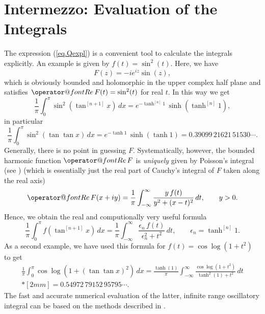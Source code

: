 \documentclass[10pt]{amsart}
\makeatletter
\renewcommand{\Re}{{\operator@font Re\,}}
\makeatother
\begin{document}
\section{Intermezzo: Evaluation of the Integrals}
\noindent
The expression (\ref{eq.Qexpl}) is a convenient tool to calculate the integrals explicitly. An example is given by $f(t) = \sin^2(t)$. Here,
we have
\[
F(z) = -i e^{iz} \sin(z),
\]
which is obviously bounded and holomorphic in the upper complex half plane and satisfies $\Re F(t) = \sin^2(t)$ for real $t$. In this way we get
\[
\frac{1}{\pi} \int_0^\pi \sin^2(\tan^{[n+1]}x)\,dx = e^{-\tanh^{[n]}1} \,\sinh (\tanh^{[n]}1),
\]
in particular
\begin{equation}\label{eq.schmelz}
\frac{1}{\pi} \int_0^\pi \sin^2(\tan\tan x)\,dx = e^{-\tanh 1} \,\sinh (\tanh 1) = 0.39099\,21621\,51530 \cdots .
\end{equation}
Generally, there is no point in guessing $F$. Systematically, however, the bounded harmonic function $\Re F$ is \emph{uniquely} given by Poisson's integral (see \cite[(15.4-3)]{Hen}) (which is
essentially just the real part of Cauchy's integral of $F$ taken along the real axis)
\[
\Re F(x+i y)  = \frac{1}{\pi} \int_{-\infty}^\infty \frac{y\, f(t)}{y^2 + (x-t)^2}\,dt,\qquad y>0.
\]
Hence, we obtain the real and computionally very useful formula
\begin{equation}\label{eq.real}
{\frac{1}{\pi} \int_0^\pi f(\tan^{[n+1]}x)\,dx = \frac{1}{\pi} \int_{-\infty}^\infty \frac{ \epsilon_n\,f(t)}{\epsilon_n^2 + t^2}\,dt,\qquad \epsilon_n = \tanh^{[n]}1.}
\end{equation}
As a second example, we have used this formula for $f(t)=\cos\log(1+t^2)$ to get
\begin{multline*}
\frac{1}{\pi} \int_0^\pi \cos\log(1+(\tan\tan x)^2)\,dx = \frac{\tanh(1)}{\pi} \int_{-\infty}^\infty \frac{ \cos\log(1+t^2)}{\tanh^2(1) + t^2}\,dt \\*[2mm] = 0.54972\,79152\,95795 \cdots .
\end{multline*}
The fast and accurate numerical evaluation of the latter, infinite range oscillatory integral can be based on the methods described in \cite[Chap.~1]{Chal}.

\medskip
\end{document}
